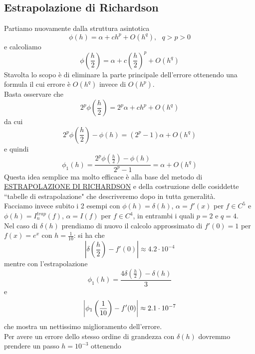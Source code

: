 \subsection{Estrapolazione di Richardson}
Partiamo nuovamente dalla struttura asintotica
\begin{equation*}
    \phi(h)=\alpha+ch^p+O(h^q),\  \  \ q>p>0
\end{equation*}
e calcoliamo 
\begin{equation*}
    \phi(\frac{h}{2})=\alpha+c(\frac{h}{2})^p+O(h^q)
\end{equation*}
Stavolta lo scopo è di eliminare la parte principale dell'errore
ottenendo una formula il cui errore è $O(h^q)$ invece di $O(h^p)$.\\Basta osservare che
\begin{equation*}
    2^p\phi(\frac{h}{2})=2^p\alpha+ch^p+O(h^q)
\end{equation*}
da cui
\begin{equation*}
    2^p\phi(\frac{h}{2})-\phi(h)=(2^p-1)\alpha+O(h^q)
\end{equation*}
e quindi
\begin{equation*}
    \phi_1(h)=\frac{2^p\phi(\frac{h}{2})-\phi(h)}{2^p-1}=\alpha+O(h^q)
\end{equation*}
Questa idea semplice ma molto efficace è alla base del metodo di \uline{ESTRAPOLAZIONE DI RICHARDSON} e della costruzione delle cosiddette
``tabelle di estrapolazione" che descriveremo dopo in tutta generalità.\\Facciamo invece subito i 2 esempi con $\phi(h)=\delta(h)$, $\alpha=f'(x)$ per $f\in C^5$ e $\phi(h)=I_n^{trap}(f)$, $\alpha=I(f)$ per $f\in C^4$, in entrambi i quali $p=2$ e $q=4$.\\Nel caso di $\delta(h)$ prendiamo di nuovo il calcolo approssimato di $f'(0)=1$ per $f(x)=e^x$ con $h=\frac{1}{10}$: si ha che 
\begin{equation*}
    |\delta(\frac{h}{2})-f'(0)|\approx4.2\cdot 10^{-4}
\end{equation*}
mentre con l'estrapolazione
\[\phi_1(h) = \frac{4\delta \left( \frac{h}{2} \right) - \delta(h)}{3}\] e
\[ \abs*{\phi_1 \left(\frac{1}{10}\right) - f'(0)} \approx 2.1 \cdot 10^{-7}\]
che mostra un nettissimo miglioramento dell'errore. \\
Per avere un errore dello stesso ordine di grandezza con $\delta(h)$ dovremmo prendere un passo $h = 10^{-3}$ ottenendo
